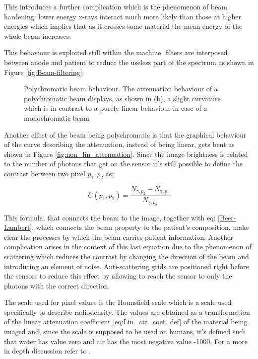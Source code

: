 This introduces a further complication which is the phenomenon of beam hardening: lower energy x-rays interact much more likely than those at higher energies which implies that as it crosses some material the mean energy of the whole beam increases. 

This behaviour is exploited still within the machine: filters are interposed between anode and patient to reduce the useless part of the spectrum as shown in Figure \ref{fig:Beam-filtering}:

\begin{figure}[H]
\centering
        \caption{Polychromatic beam behaviour. The attenuation behaviour of a polychromatic beam displays, as shown in (b), a slight curvature which is in contrast to a purely linear behaviour in case of a monochromatic beam}\label{fig:polychrom_behaviour}
\end{figure}

Another effect of the beam being polychromatic is that the graphical behaviour of the curve describing the attenuation, instead of being linear, gets bent as shown in Figure \ref{fig:non_lin_attenuation}. Since the image brightness is related to the number of photons that get on the sensor it's still possible to define the contrast between two pixel $p_1, p_2$ as:

\begin{equation}
C(p_1,p_2) = \frac{N_{\gamma ,p_2}-N_{\gamma ,p_1}}{N_{\gamma ,p_2}}
\end{equation}

This formula, that connects the beam to the image, together with eq: \ref{Beer-Lambert}, which connects the beam property to the patient's composition, make clear the processes by which the beam carries patient information. Another complication arises in the context of this last equation due to the phenomenon of scattering which reduces the contrast by changing the direction of the beam and introducing an element of noise. Anti-scattering grids are positioned right before the sensors to reduce this effect by allowing to reach the sensor to only the photons with the correct direction.

The scale used for pixel values is the Hounsfield scale which is a scale used specifically to describe radiodensity.
The values are obtained as a transformation of the linear attenuation coefficient \ref{eq:Lin_att_coef_def} of the material being imaged and, since the scale is supposed to be used on humans, it's defined such that water has value zero and air has the most negative value -1000. For  a more in depth discussion refer to \cite{Hounsfield}.

